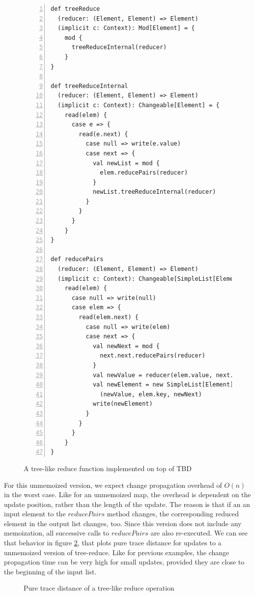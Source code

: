 \begin{figure}
\begin{lstlisting}[frame=single,basicstyle=\ttfamily,numbers=left,mathescape=true]
def treeReduce
  (reducer: (Element, Element) => Element)
  (implicit c: Context): Mod[Element] = {
    mod {
      treeReduceInternal(reducer)
    }
}

def treeReduceInternal
  (reducer: (Element, Element) => Element)
  (implicit c: Context): Changeable[Element] = {
    read(elem) {
      case e => {
        read(e.next) {
          case null => write(e.value)
          case next => {
            val newList = mod {
              elem.reducePairs(reducer)
            }
            newList.treeReduceInternal(reducer)
          }
        }
      }
    }
}

def reducePairs
  (reducer: (Element, Element) => Element)
  (implicit c: Context): Changeable[SimpleList[Element]] = {
    read(elem) {
      case null => write(null)
      case elem => {
        read(elem.next) {
          case null => write(elem)
          case next => {
            val newNext = mod {
              next.next.reducePairs(reducer)
            }
            val newValue = reducer(elem.value, next.value)
            val newElement = new SimpleList[Element]
              (newValue, elem.key, newNext)
            write(newElement)
          }
        }
      }
    }
}

\end{lstlisting}
\caption{A tree-like reduce function implemented on top of TBD}
\label{code:tree_reduce}
\end{figure}

For this unmemoized version, we expect change propagation overhead of $O(n)$ in the worst case. Like for an unmemoized map, the overhead is dependent on the update position, rather than the length of the update. The reason is that if an an input element to the $reducePairs$ method changes, the corresponding reduced element in the output list changes, too. Since this version does not include any memoization, all successive calls to $reducePairs$ are also re-executed. We can see that behavior in figure \ref{plot:tree_reduce_pure}, that plots pure trace distance for updates to a unmemoized version of tree-reduce. Like for previous examples, the change propagation time can be very high for small updates, provided they are close to the beginning of the input list. 

\begin{figure}
\centering
{}
\caption{Pure trace distance of a tree-like reduce operation}
\label{plot:tree_reduce_pure}
\end{figure}


